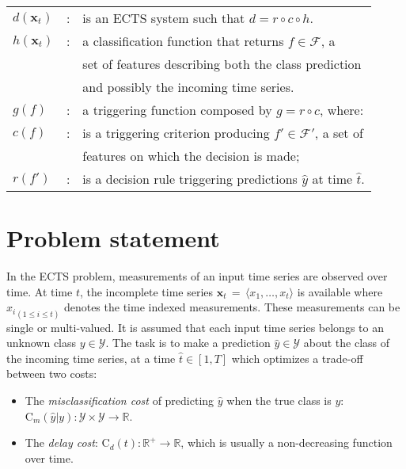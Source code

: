 \documentclass[sigconf, nonacm, table]{acmart}
\begin{document}
\smallskip
\begin{tabular}{lcl}
$d({\mathbf x}_t)$&:& is an ECTS system such that $d = r \circ c \circ h$.\\
$h({\mathbf x}_t)$&:& a classification function that returns $f \in \mathcal{F}$, a\\
&& set of features describing both the class prediction\\
&& and possibly the incoming time series.\\
$g(f)$&:& a triggering function composed by $g = r \circ c$, where:\\
$c(f)$&:& is a triggering criterion producing $f' \in \mathcal{F}'$, a set of\\
&& features on which the decision is made; \\
$r(f')$&:& is a decision rule triggering predictions $\hat{y}$ at time $\hat{t}$.\\
\end{tabular}






















\section{Problem statement}
\label{sec:problem_statement}

In the ECTS problem, measurements of an input time series are observed over time. At time $t$, the incomplete time series ${\mathbf x}_t \, = \, \langle {x_1}, \ldots, {x_t} \rangle$ is available where ${x_i}_{(1 \leq i \leq t)}$ denotes the time indexed measurements. These measurements can be single or multi-valued. It is assumed that each input time series belongs to an unknown class $y \in {\mathcal{Y}}$. The task is to make a prediction $\hat{y} \in {\mathcal{Y}}$ about the class of the incoming time series, at a time $\hat{t} \in [1,T]$ 
which optimizes a trade-off between two costs:


\begin{itemize}
    \item The \textit{misclassification cost} of predicting $\hat{y}$ when the true class is $y$: $\mathrm{C}_m(\hat{y}|y): {\mathcal{Y}} \times {\mathcal{Y}} \rightarrow \mathbb{R}$.
	\item The \textit{delay cost}: $\mathrm{C}_d(t) : \mathbb{R}^+ \rightarrow \mathbb{R}$, which is usually a non-decreasing function over time.
\end{itemize}
\end{document}
